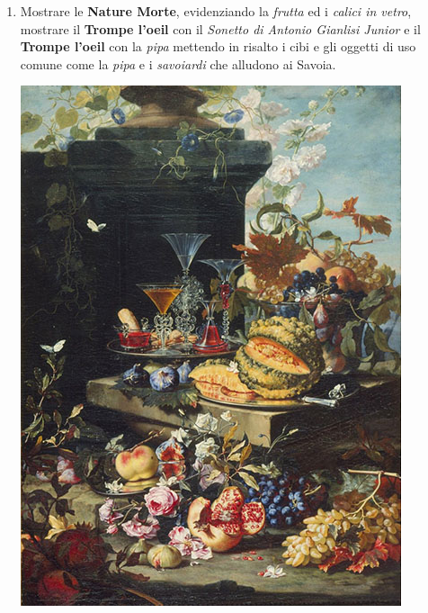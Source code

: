 \documentclass[12pt,a4paper]{article}
\begin{document}
\begin{enumerate}
	
	\item Mostrare le \textbf{Nature Morte}, evidenziando la \textit{frutta} ed i \textit{calici in vetro}, mostrare il \textbf{Trompe l'oeil} con il \textit{Sonetto di Antonio Gianlisi Junior} e il \textbf{Trompe l'oeil} con la \textit{pipa} mettendo in risalto i cibi e gli oggetti di uso comune come la \textit{pipa} e i \textit{savoiardi} che alludono ai Savoia.\par
	\begin{minipage}{\linewidth}
		\centering
		\includegraphics[scale= 0.3]{Fiori_Frutta.jpg}
	\end{minipage}
	

\end{enumerate}
\end{document}
